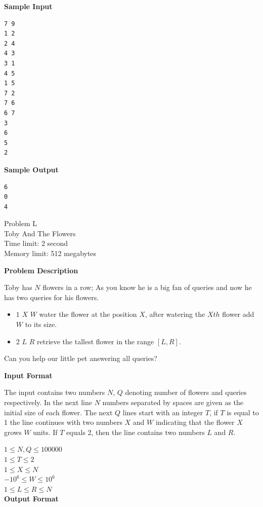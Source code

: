 \documentclass[11pt]{article}
\begin{document}
\textbf{\large Sample Input}

\begin{verbatim}
7 9
1 2
2 4
4 3
3 1
4 5
1 5
7 2
7 6
6 7
3
6
5
2
\end{verbatim}

\textbf{\large Sample Output}

\begin{verbatim}
6
0
4
\end{verbatim}

\newpage

        \begin{center}
            {\LARGE Problem L}\\
            {\Large Toby And The Flowers}\\
            {Time limit: 2 second}\\
            {Memory limit: 512 megabytes}
        \end{center}\textbf{\large Problem Description}

Toby has $N$ flowers in a row; As you know he is a big fan of queries and now
he has two queries for his flowers.

\begin{itemize}
    \item $1$ $X$ $W$ water the flower at the position $X$, after watering the $Xth$ flower add $W$ to its size.
    \item $2$ $L$ $R$ retrieve the tallest flower in the range $[L, R]$.
\end{itemize}

Can you help our little pet answering all queries?

\textbf{\large Input Format}

The input contains two numbers $N$, $Q$ denoting number of flowers and queries
respectively. In the next line $N$ numbers separated by spaces are given as the initial size of each flower.
The next $Q$ lines start with an integer $T$, if $T$ is equal to 1 the line continues with
two numbers $X$ and $W$ indicating that the flower $X$ grows $W$ units. If $T$ equals 2, then
the line contains two numbers $L$ and $R$.

$1 \le N, Q \le 100000$ \\
$1 \le T \le 2 $\\
$1 \le X \le N$ \\
$-10^6 \le W \le 10^6$\\
$1 \le L \le R \le N $\\

\textbf{\large Output Format}
\end{document}
